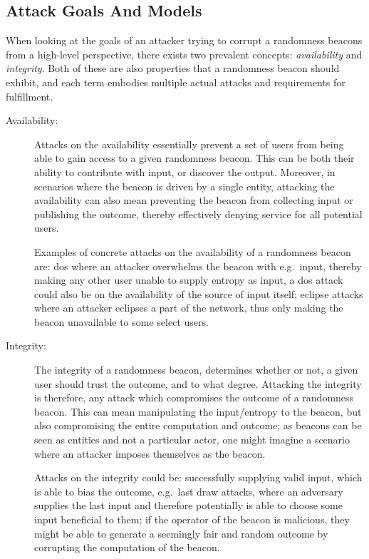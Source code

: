 \subsection{Attack Goals And Models}
\label{sub:attack_goals_and_models}
When looking at the goals of an attacker trying to corrupt a randomness beacons from a high-level perspective, there exists two prevalent concepts: \emph{availability} and \emph{integrity}.
Both of these are also properties that a randomness beacon should exhibit, and each term embodies multiple actual attacks and requirements for fulfillment.

\begin{description}
    \item[Availability:]
        Attacks on the availability essentially prevent a set of users from being able to gain access to a given randomness beacon.
        This can be both their ability to contribute with input, or discover the output.
        Moreover, in scenarios where the beacon is driven by a single entity, attacking the availability can also mean preventing the beacon from collecting input or publishing the outcome, thereby effectively denying service for all potential users.

        Examples of concrete attacks on the availability of a randomness beacon are:
        \acrfull{dos} where an attacker overwhelms the beacon with e.g.\ input, thereby making any other user unable to supply entropy as input, a \gls{dos} attack could also be on the availability of the source of input itself; eclipse attacks where an attacker eclipses a part of the network, thus only making the beacon unavailable to some select users.
    \item[Integrity:]
        The integrity of a randomness beacon, determines whether or not, a given user should trust the outcome, and to what degree.
        Attacking the integrity is therefore, any attack which compromises the outcome of a randomness beacon.
        This can mean manipulating the input/entropy to the beacon, but also compromising the entire computation and outcome;
        as beacons can be seen as entities and not a particular actor, one might imagine a scenario where an attacker imposes themselves as the beacon.

        Attacks on the integrity could be: successfully supplying valid input, which is able to bias the outcome, e.g.\ last draw attacks, where an adversary supplies the last input and therefore potentially is able to choose some input beneficial to them; if the operator of the beacon is malicious, they might be able to generate a seemingly fair and random outcome by corrupting the computation of the beacon.
\end{description}


